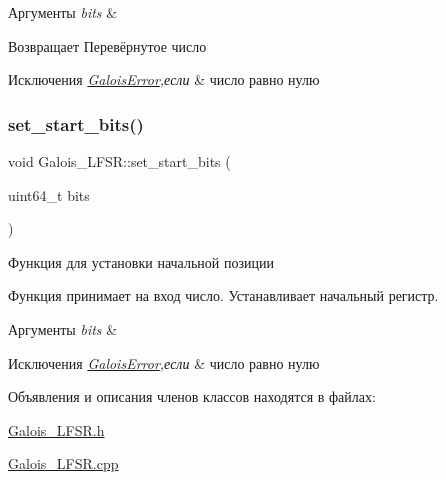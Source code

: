 \begin{DoxyParams}{Аргументы}
{\em bits} & \\
\hline
\end{DoxyParams}
\begin{DoxyReturn}{Возвращает}
Перевёрнутое число 
\end{DoxyReturn}

\begin{DoxyExceptions}{Исключения}
{\em \hyperlink{classGaloisError}{Galois\+Error},если} & число равно нулю \\
\hline
\end{DoxyExceptions}
\mbox{\label{classGalois__LFSR_aa3a893992b929b01a649d859a121ae34}} 
\subsubsection{\texorpdfstring{set\+\_\+start\+\_\+bits()}{set\_start\_bits()}}
{\footnotesize\ttfamily void Galois\+\_\+\+L\+F\+S\+R\+::set\+\_\+start\+\_\+bits (\begin{DoxyParamCaption}\item[{uint64\+\_\+t}]{bits }\end{DoxyParamCaption})}



Функция для установки начальной позиции 

Функция принимает на вход число. Устанавливает начальный регистр.


\begin{DoxyParams}{Аргументы}
{\em bits} & \\
\hline
\end{DoxyParams}

\begin{DoxyExceptions}{Исключения}
{\em \hyperlink{classGaloisError}{Galois\+Error},если} & число равно нулю \\
\hline
\end{DoxyExceptions}


Объявления и описания членов классов находятся в файлах\+:\begin{DoxyCompactItemize}
\item 
\hyperlink{Galois__LFSR_8h}{Galois\+\_\+\+L\+F\+S\+R.\+h}\item 
\hyperlink{Galois__LFSR_8cpp}{Galois\+\_\+\+L\+F\+S\+R.\+cpp}\end{DoxyCompactItemize}
